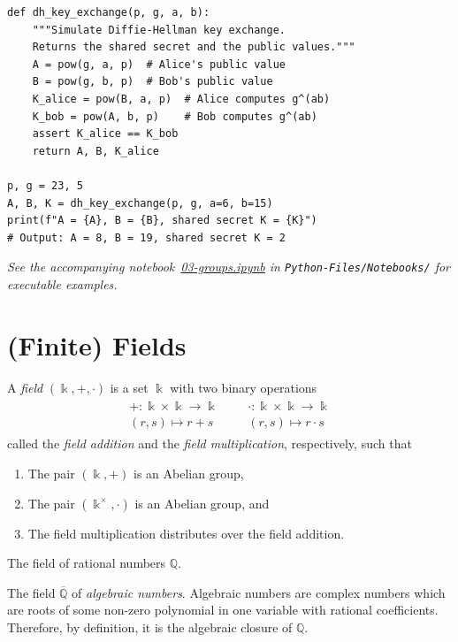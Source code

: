 \documentclass[a4paper, 12pt]{book} %
\newcommand{\notebook}[1]{\begingroup\small\itshape
    See the accompanying notebook~\href{run:./Python-Files/Notebooks/#1}{#1} in \texttt{Python-Files/Notebooks/} for executable examples.%
\endgroup}
\begin{document}
\begin{verbatim}
def dh_key_exchange(p, g, a, b):
    """Simulate Diffie-Hellman key exchange.
    Returns the shared secret and the public values."""
    A = pow(g, a, p)  # Alice's public value
    B = pow(g, b, p)  # Bob's public value
    K_alice = pow(B, a, p)  # Alice computes g^(ab)
    K_bob = pow(A, b, p)    # Bob computes g^(ab)
    assert K_alice == K_bob
    return A, B, K_alice

p, g = 23, 5
A, B, K = dh_key_exchange(p, g, a=6, b=15)
print(f"A = {A}, B = {B}, shared secret K = {K}")
# Output: A = 8, B = 19, shared secret K = 2
\end{verbatim}

\notebook{03-groups.ipynb}

\chapter{(Finite) Fields}
\label{ch:fields}

\begin{definition}
    A \emph{field} $(\Bbbk, +, \cdot)$ is a set $\Bbbk$ with two binary operations
    \begin{align}
        \begin{array}{cccc}
        +: \Bbbk \times \Bbbk \longrightarrow \Bbbk & & &\cdot: \Bbbk \times \Bbbk \rightarrow \Bbbk  \\
         (r, s) \mapsto r+s & & & (r,s) \mapsto r\cdot s 
    \end{array}
    \end{align}
    called the \emph{field addition} and the \emph{field multiplication}, respectively, such that 
    \begin{enumerate}
        \item The pair $(\Bbbk, +)$ is an Abelian group, 
        \item The pair $(\Bbbk^\times, \cdot)$ is an Abelian group, and
        \item The field multiplication distributes over the field addition.
    \end{enumerate}
\end{definition}

\begin{example}
The field of rational numbers $\mathbb{Q}$.
\end{example}

\begin{example}
The field $\overline{\mathbb{Q}}$ of \emph{algebraic numbers}. Algebraic numbers  are complex numbers which are roots of some non-zero polynomial in one variable with rational coefficients. Therefore, by definition, it is the algebraic closure of $\mathbb{Q}$. 
\end{example}
\end{document}
